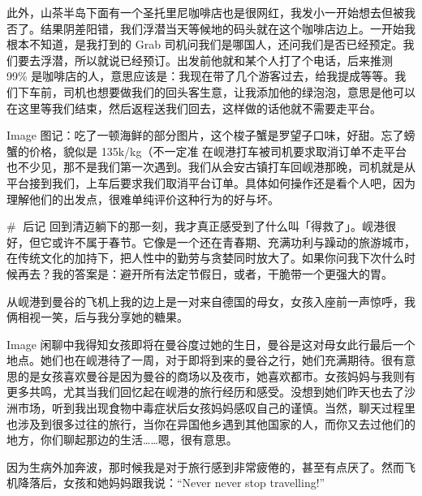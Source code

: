 此外，山茶半岛下面有一个圣托里尼咖啡店也是很网红，我发小一开始想去但被我否了。结果阴差阳错，我们浮潜当天等候地的码头就在这个咖啡店边上。一开始我根本不知道，是我打到的 Grab 司机问我们是哪国人，还问我们是否已经预定。我们要去浮潜，所以就说已经预订。出发前他就和某个人打了个电话，后来推测 99\% 是咖啡店的人，意思应该是：我现在带了几个游客过去，给我提成等等。我们下车前，司机也想要做我们的回头客生意，让我添加他的绿泡泡，意思是他可以在这里等我们结束，然后返程送我们回去，这样做的话他就不需要走平台。

Image
图记：吃了一顿海鲜的部分图片，这个梭子蟹是罗望子口味，好甜。忘了螃蟹的价格，貌似是 135k/kg（不一定准
在岘港打车被司机要求取消订单不走平台也不少见，那不是我们第一次遇到。我们从会安古镇打车回岘港那晚，司机就是从平台接到我们，上车后要求我们取消平台订单。具体如何操作还是看个人吧，因为理解他们的出发点，很难单纯评价这种行为的好与坏。

# 💬后记
回到清迈躺下的那一刻，我才真正感受到了什么叫「得救了」。岘港很好，但它或许不属于春节。它像是一个还在青春期、充满功利与躁动的旅游城市，在传统文化的加持下，把人性中的勤劳与贪婪同时放大了。如果你问我下次什么时候再去？我的答案是：避开所有法定节假日，或者，干脆带一个更强大的胃。

从岘港到曼谷的飞机上我的边上是一对来自德国的母女，女孩入座前一声惊呼，我俩相视一笑，后与我分享她的糖果。

Image
闲聊中我得知女孩即将在曼谷度过她的生日，曼谷是这对母女此行最后一个地点。她们也在岘港待了一周，对于即将到来的曼谷之行，她们充满期待。很有意思的是女孩喜欢曼谷是因为曼谷的商场以及夜市，她喜欢都市。女孩妈妈与我则有更多共鸣，尤其当我们回忆起在岘港的旅行经历和感受。没想到她们昨天也去了沙洲市场，听到我出现食物中毒症状后女孩妈妈感叹自己的谨慎。当然，聊天过程里也涉及到很多过往的旅行，当你在异国他乡遇到其他国家的人，而你又去过他们的地方，你们聊起那边的生活……嗯，很有意思。

因为生病外加奔波，那时候我是对于旅行感到非常疲倦的，甚至有点厌了。然而飞机降落后，女孩和她妈妈跟我说：“Never never stop travelling!”

